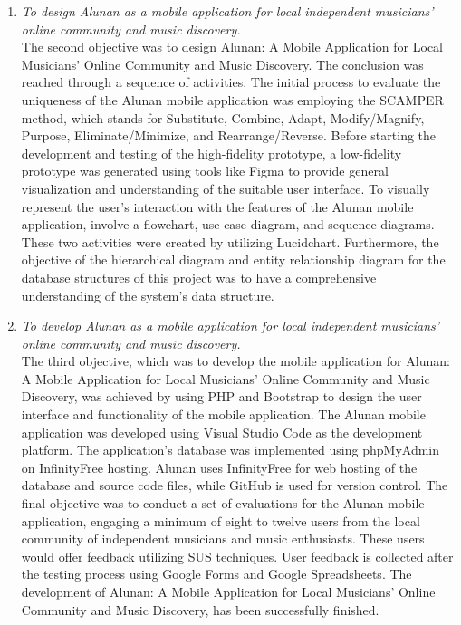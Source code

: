 \begin{enumerate}[A.]
\begin{enumerate}[1.]
        \item \textit{To design Alunan as a mobile application for local independent musicians’ online community and music discovery.} \\
        The second objective was to design Alunan: A Mobile Application for Local Musicians’ Online Community and Music Discovery. The conclusion was reached through a sequence of activities. The initial process to evaluate the uniqueness of the Alunan mobile application was employing the SCAMPER method, which stands for Substitute, Combine, Adapt, Modify/Magnify, Purpose, Eliminate/Minimize, and Rearrange/Reverse. Before starting the development and testing of the high-fidelity prototype, a low-fidelity prototype was generated using tools like Figma to provide general visualization and understanding of the suitable user interface. To visually represent the user's interaction with the features of the Alunan mobile application, involve a flowchart, use case diagram, and sequence diagrams. These two activities were created by utilizing Lucidchart. Furthermore, the objective of the hierarchical diagram and entity relationship diagram for the database structures of this project was to have a comprehensive understanding of the system's data structure.

        \item \textit{To develop Alunan as a mobile application for local independent musicians’ online community and music discovery.} \\
        The third objective, which was to develop the mobile application for Alunan: A Mobile Application for Local Musicians’ Online Community and Music Discovery, was achieved by using PHP and Bootstrap to design the user interface and functionality of the mobile application. The Alunan mobile application was developed using Visual Studio Code as the development platform. The application's database was implemented using phpMyAdmin on InfinityFree hosting. Alunan uses InfinityFree for web hosting of the database and source code files, while GitHub is used for version control. The final objective was to conduct a set of evaluations for the Alunan mobile application, engaging a minimum of eight to twelve users from the local community of independent musicians and music enthusiasts. These users would offer feedback utilizing SUS techniques. User feedback is collected after the testing process using Google Forms and Google Spreadsheets. The development of Alunan: A Mobile Application for Local Musicians’ Online Community and Music Discovery, has been successfully finished.

    \end{enumerate}
\end{enumerate}

